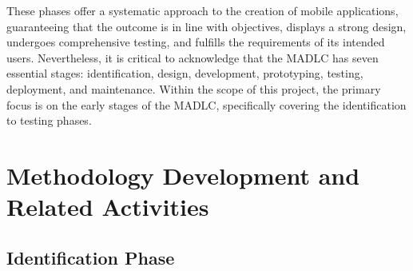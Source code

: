 These phases offer a systematic approach to the creation of mobile applications, guaranteeing that the outcome is in line with objectives, displays a strong design, undergoes comprehensive testing, and fulfills the requirements of its intended users. Nevertheless, it is critical to acknowledge that the MADLC has seven essential stages: identification, design, development, prototyping, testing, deployment, and maintenance. Within the scope of this project, the primary focus is on the early stages of the MADLC, specifically covering the identification to testing phases.
\pagebreak

\section{Methodology Development and Related Activities}
\subsection{Identification Phase}

